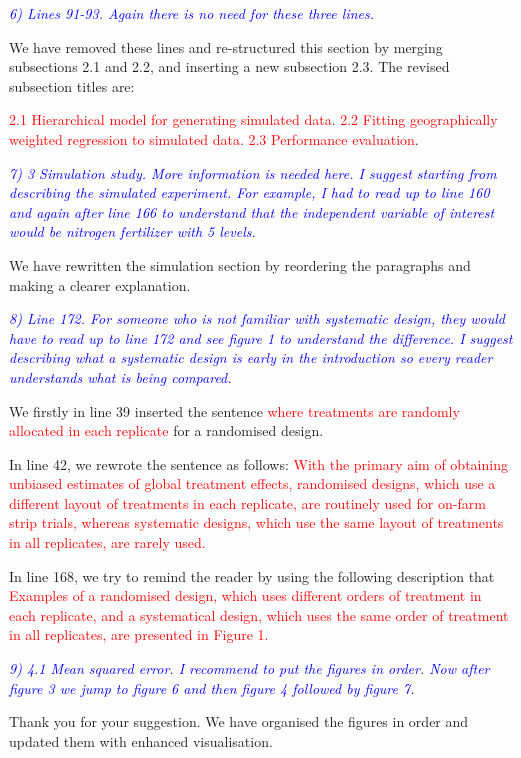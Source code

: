 \documentclass[a4paper]{article}   	%
\newcommand{\revision}[1]{\textcolor{red}{#1}}
\newcommand{\reviewer}[1]{\textcolor{blue}{\textit{#1}}}
\begin{document}
\reviewer{6) Lines 91-93. Again there is no need for these three lines.}

We have removed these lines and re-structured this section by merging subsections 2.1 and 2.2, and inserting a new subsection 2.3. The revised subsection titles are: 

\revision{2.1 Hierarchical model for generating simulated data}.
\revision{2.2 Fitting geographically weighted regression to simulated data}.
\revision{2.3 Performance evaluation}.


\reviewer{7) 3 Simulation study. More information is needed here. I suggest starting from describing the simulated experiment. For example, I had to read up to line 160 and again after line 166 to understand that the independent variable of interest would be nitrogen fertilizer with 5 levels.}

We have rewritten the simulation section by reordering the paragraphs and making a clearer explanation. 

\reviewer{8) Line 172. For someone who is not familiar with systematic design, they would have to read up to line 172 and see figure 1 to understand the difference. I suggest describing what a systematic design is early in the introduction so every reader understands what is being compared.}

We firstly in line 39 inserted the sentence \revision{ where treatments are randomly allocated in each replicate} for a randomised design. 

In line 42, we rewrote the sentence as follows: \revision{With the primary aim of obtaining unbiased estimates of global treatment effects, randomised designs, which use a different layout of treatments in each replicate, are routinely used for on-farm strip trials, whereas systematic designs, which use the same layout of treatments in all replicates, are rarely used.}

In line 168, we try to remind the reader by using the following description that \revision{Examples of a randomised design, which uses different orders of treatment in each replicate, and a systematical design, which uses the same order of treatment in all replicates, are presented in Figure 1.}



\reviewer{9) 4.1 Mean squared error. I recommend to put the figures in order. Now after figure 3 we jump to figure 6 and then figure 4 followed by figure 7.}

Thank you for your suggestion. We have organised the figures in order and updated them with enhanced visualisation.
\end{document}
